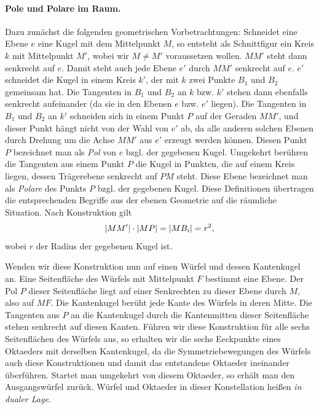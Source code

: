 \documentclass[11pt]{article}
\begin{document}
\paragraph{Pole und Polare im Raum.}
Dazu zunächst die folgenden geometrischen Vorbetrachtungen: Schneidet eine
Ebene $e$ eine Kugel mit dem Mittelpunkt $M$, so entsteht als Schnittfigur ein
Kreis $k$ mit Mittelpunkt $M'$, wobei wir $M\neq M'$ voraussetzen wollen.
$MM'$ steht dann senkrecht auf $e$. Damit steht auch jede Ebene $e'$ durch
$MM'$ senkrecht auf $e$.  $e'$ schneidet die Kugel in einem Kreis $k'$, der
mit $k$ zwei Punkte $B_1$ und $B_2$ gemeinsam hat.  Die Tangenten in $B_1$ und
$B_2$ an $k$ bzw. $k'$ stehen dann ebenfalls senkrecht aufeinander (da sie in
den Ebenen $e$ bzw. $e'$ liegen).  Die Tangenten in $B_1$ und $B_2$ an $k'$
schneiden sich in einem Punkt $P$ auf der Geraden $MM'$, und dieser Punkt
hängt nicht von der Wahl von $e'$ ab, da alle anderen solchen Ebenen durch
Drehung um die Achse $MM'$ aus $e'$ erzeugt werden können.  Diesen Punkt $P$
bezeichnet man als \emph{Pol} von $e$ bzgl.  der gegebenen Kugel. Umgekehrt
berühren die Tangenten aus einem Punkt $P$ die Kugel in Punkten, die auf einem
Kreis liegen, dessen Trägerebene senkrecht auf $PM$ steht.  Diese Ebene
bezeichnet man als \emph{Polare} des Punkts $P$ bzgl. der gegebenen Kugel.
Diese Definitionen übertragen die entsprechenden Begriffe aus der ebenen
Geometrie auf die räumliche Situation.  Nach Konstruktion gilt
\begin{gather*}
  \left\vert {\mathnormal{MM'}}\right\vert\cdot\left\vert {\mathnormal{MP}}\right\vert=\left\vert {\mathnormal{MB_i}}\right\vert=r^2,
\end{gather*}
wobei $r$ der Radius der gegebenen Kugel ist. 

Wenden wir diese Konstruktion nun auf einen Würfel und dessen Kantenkugel an.
Eine Seitenfläche des Würfels mit Mittelpunkt $F$ bestimmt eine Ebene.  Der
Pol $P$ dieser Seitenfläche liegt auf einer Senkrechten zu dieser Ebene durch
$M$, also auf $MF$.  Die Kantenkugel berüht jede Kante des Würfels in deren
Mitte. Die Tangenten aus $P$ an die Kantenkugel durch die Kantenmitten dieser
Seitenfläche stehen senkrecht auf diesen Kanten. Führen wir diese Konstruktion
für alle sechs Seitenflächen des Würfels aus, so erhalten wir die sechs
Eeckpunkte eines Oktaeders mit derselben Kantenkugel, da die
Symmetriebewegungen des Würfels auch diese Konstruktionen und damit das
entstandene Oktaeder ineinander überführen.  Startet man umgekehrt von diesem
Oktaeder, so erhält man den Ausgangswürfel zurück.  Würfel und Oktaeder in
dieser Konstellation heißen \emph{in dualer Lage}.
\end{document}
